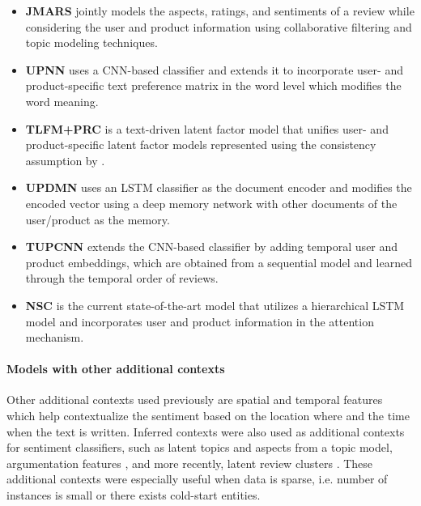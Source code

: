 \documentclass[11pt,a4paper]{article}
\begin{document}
\begin{itemize}
    \setlength\itemsep{-5pt}
    \item \textbf{JMARS} \cite{diao2014jointly} jointly models the aspects, ratings, and sentiments of a review while considering the user and product information using collaborative filtering and topic modeling techniques.
    \item \textbf{UPNN} \cite{tang2015learning} uses a CNN-based classifier and extends it to incorporate user- and product-specific text preference matrix in the word level which modifies the word meaning.
    \item \textbf{TLFM+PRC} \cite{song2017recommendation} is a text-driven latent factor model that unifies user- and product-specific latent factor models represented using the consistency assumption by \citet{tang2015learning}.
    \item \textbf{UPDMN} \cite{dou2017capturing} uses an LSTM classifier as the document encoder and modifies the encoded vector using a deep memory network with other documents of the user/product as the memory.
    \item \textbf{TUPCNN} \cite{chen2016learning} extends the CNN-based classifier by adding temporal user and product embeddings, which are obtained from a sequential model and learned through the temporal order of reviews.
    \item \textbf{NSC} \cite{chen2016neural} is the current state-of-the-art model that utilizes a hierarchical LSTM model \cite{yang2016hierarchical} and incorporates user and product information in the attention mechanism.
\end{itemize}

\paragraph{Models with other additional contexts}
Other additional contexts used previously are spatial \cite{yang2017identifying} and temporal \cite{fukuhara2007understanding} features which help contextualize the sentiment based on the location where and the time when the text is written. Inferred contexts were also used as additional contexts for sentiment classifiers, such as latent topics \cite{lin2009joint} and aspects \cite{jo2011aspect} from a topic model, argumentation features \cite{wachsmuth2015sentiment}, and more recently, latent review clusters \cite{amplayo2017aspect}. These additional contexts were especially useful when data is sparse, i.e. number of instances is small or there exists cold-start entities.
\end{document}
